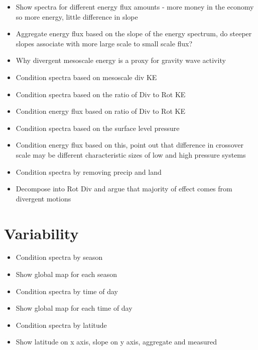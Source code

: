 \begin{itemize}
\item{Show spectra for different energy flux amounts - more money in the economy so more energy, little difference in slope}

\item{Aggregate energy flux based on the slope of the energy spectrum, do steeper slopes associate with more large scale to small scale flux?}

\item{Why divergent mesoscale energy is a proxy for gravity wave activity}

\item{Condition spectra based on mesoscale div KE}

\item{Condition spectra based on the ratio of Div to Rot KE}

\item{Condition energy flux based on ratio of Div to Rot KE}

\item{Condition spectra based on the surface level pressure}

\item{Condition energy flux based on this, point out that difference in crossover scale may be different characteristic sizes of low and high pressure systems}

\item{Condition spectra by removing precip and land}

\item{Decompose into Rot Div and argue that majority of effect comes from divergent motions}

\end{itemize}

\section{Variability}

\begin{itemize}

\item{Condition spectra by season}

\item{Show global map for each season}

\item{Condition spectra by time of day}

\item{Show global map for each time of day}

\item{Condition spectra by latitude}

\item{Show latitude on x axis, slope on y axis, aggregate and measured}

\end{itemize}

